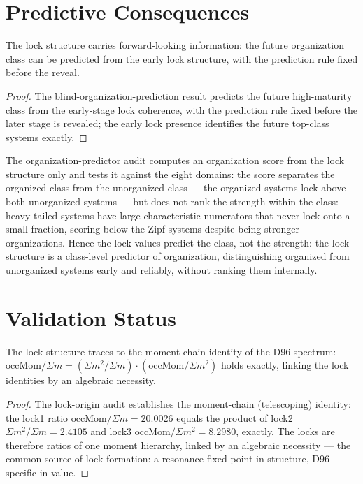 \section{Predictive Consequences}
\label{c08:sec:predictive}

\begin{theorem}
\label{c08:thm:blind-prediction}
The lock structure carries forward-looking information: the future organization class can be
predicted from the early lock structure, with the prediction rule fixed before the reveal.
\end{theorem}

\begin{proof}
The blind-organization-prediction result predicts the future high-maturity class from the
early-stage lock coherence, with the prediction rule fixed before the later stage is
revealed; the early lock presence identifies the future top-class systems exactly.
\end{proof}

The organization-predictor audit \cite{c08:QG314} computes an organization score from the
lock structure only and tests it against the eight domains: the score separates the
organized class from the unorganized class --- the organized systems lock above both
unorganized systems --- but does not rank the strength within the class: heavy-tailed
systems have large characteristic numerators that never lock onto a small fraction, scoring
below the Zipf systems despite being stronger organizations. Hence the lock values predict
the class, not the strength: the lock structure is a class-level predictor of organization,
distinguishing organized from unorganized systems early and reliably, without ranking them
internally.

\section{Validation Status}
\label{c08:sec:validation}

\begin{theorem}
\label{c08:thm:lock-origin}
The lock structure traces to the moment-chain identity of the D96 spectrum:
$\mathrm{occMom}/\Sigma m = (\Sigma m^2/\Sigma m)\cdot(\mathrm{occMom}/\Sigma m^2)$
holds exactly, linking the lock identities by an algebraic necessity.
\end{theorem}

\begin{proof}
The lock-origin audit \cite{c08:QG318.1} establishes the moment-chain (telescoping)
identity: the lock1 ratio $\mathrm{occMom}/\Sigma m = 20.0026$ equals the product of lock2
$\Sigma m^2/\Sigma m = 2.4105$ and lock3 $\mathrm{occMom}/\Sigma m^2 = 8.2980$, exactly.
The locks are therefore ratios of one moment hierarchy, linked by an algebraic necessity ---
the common source of lock formation: a resonance fixed point in structure, D96-specific in
value.
\end{proof}

